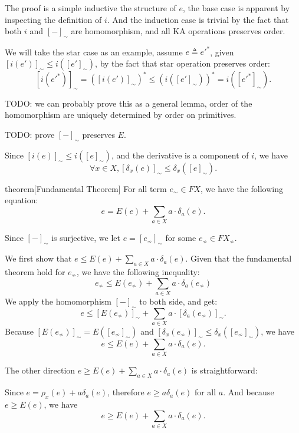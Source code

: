 \documentclass[a4paper,UKenglish,cleveref, autoref, thm-restate]{lipics-v2021}
\begin{document}
\begin{proofEnd}
  The proof is a simple inductive the structure of \(e\),
  the base case is apparent by inspecting the definition of \(i\).
  And the induction case is trivial by the fact that both \(i\) and \([-]_ \sim \)
  are homomorphism, and all KA operations preserves order.

  We will take the star case as an example,
  assume \(e  \triangleq  e'^*\), given \([i(e')]_ \sim   \leq  i([e']_ \sim )\),
  by the fact that star operation preserves order:
  \[[i(e'^*)]_ \sim  = ([i(e')]_ \sim )^*  \leq  (i([e']_ \sim ))^* = i([e'^*]_ \sim ).\]

  TODO: we can probably prove this as a general lemma,
  order of the homomorphism are uniquely determined by order on primitives.
\end{proofEnd}

TODO: prove \([-]_ \sim \) preserves \(E\).

Since \([i(e)]_ \sim   \leq  i([e]_ \sim )\), and the derivative is a component of \(i\),
we have \[ \forall  x  \in  X, [ \delta _{x}(e)]_ \sim   \leq   \delta _{x}([e]_ \sim ).\]

\begin{theoremEnd}{theorem}[Fundamental Theorem]
  For all term \(e_ \sim   \in  F X\), we have the following equation:
  \[e = E(e) +  \sum _{a  \in  X} a  \cdot   \delta _{a}(e).\]
\end{theoremEnd}

\begin{proofEnd}
  Since \([-]_ \sim \) is surjective,
  we let \(e = [e_ \nsim ]_ \sim \) for some \(e_ \nsim   \in  F X_ \nsim \).

  We first show that \(e  \leq  E(e) +  \sum _{a  \in  X} a  \cdot   \delta _{a}(e)\).
  Given that the fundamental theorem hold for \(e_ \nsim \),
  we have the following inequality:
  \[e_ \nsim   \leq  E(e_ \nsim ) +  \sum _{a  \in  X} a  \cdot   \delta _{a}(e_ \nsim )\]
  We apply the homomorphism \([-]_ \sim \) to both side, and get:
  \[e  \leq  [E(e_ \nsim )]_ \sim  +  \sum _{a  \in  X} a  \cdot  [ \delta _{a}(e_ \nsim )]_ \sim .\]
  Because \([E(e_ \nsim )]_ \sim  = E([e_ \nsim ]_ \sim )\) and \([ \delta _{x}(e_ \nsim )]_ \sim   \leq   \delta _{x}([e_ \nsim ]_ \sim )\),
  we have
  \[e  \leq  E(e) +  \sum _{a  \in  X} a  \cdot   \delta _{a}(e).\]

  The other direction \(e  \geq  E(e) +  \sum _{a  \in  X} a  \cdot   \delta _{a}(e)\)
  is straightforward:

  Since \(e =  \rho _{x}(e) + a  \delta _{a}(e)\),
  therefore \(e  \geq  a  \delta _{a}(e)\) for all \(a\).
  And because \(e  \geq  E(e)\),
  we have \[e  \geq  E(e) +  \sum _{a  \in  X} a  \cdot   \delta _{a}(e).\]
\end{proofEnd}
\end{document}
